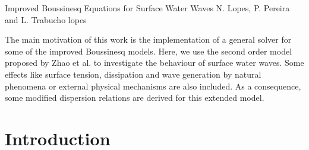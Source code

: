 \def\bu{{\bf u}}
\def\bx{{\bf x}}
\def\fba{\vartheta_1}
\def\fbb{\vartheta_2}
\def\bn{{\bf n}}
\def\bomega{{\bf  \omega}}
\def\dx{{\rm d}x}
\def\dy{{\rm d}y}
\def\dt{{\rm d}t}
\def\ds{{\rm d}s}
\newcommand{\fpar}[2]{\frac{\partial #1}{\partial #2}}
\newcommand{\grad}[1]{\nabla{#1}}
\newcommand{\diverg}[1]{\nabla\cdot{#1}}

              {Improved Boussinesq Equations for Surface Water Waves}
              {N. Lopes, P. Pereira and L. Trabucho}
              {lopes}



The main motivation of this work is the implementation of a general
solver for some of the improved Boussinesq models.  Here, we use the second order model proposed by Zhao et al.
\cite{ZhaTen04} to investigate the behaviour of surface water waves.
Some effects like surface tension, dissipation and wave generation by
natural phenomena or external physical mechanisms are also included.
As a consequence, some modified dispersion relations are derived for
this extended model.



\section{Introduction}

